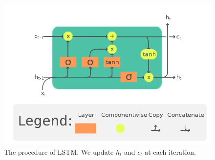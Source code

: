 \documentclass[twoside]{report}
\begin{document}
\begin{spacing}{1}
\begin{figure}[!htbp]
    \centering
    \includegraphics[scale = 0.4]{Images/LSTM.png}
    \caption{The procedure of LSTM. We update $h_t$ and $c_t$ at each iteration.}
    \label{fig:LSTM}
\end{figure}




\end{spacing}
\end{document}
